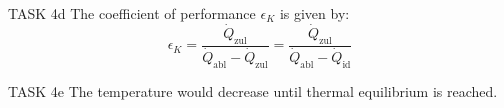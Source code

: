 TASK 4d  
The coefficient of performance \( \epsilon_K \) is given by:  
\[
\epsilon_K = \frac{\dot{Q}_{\text{zul}}}{\dot{Q}_{\text{abl}} - \dot{Q}_{\text{zul}}} = \frac{\dot{Q}_{\text{zul}}}{\dot{Q}_{\text{abl}} - \dot{Q}_{\text{id}}}
\]

TASK 4e  
The temperature would decrease until thermal equilibrium is reached.